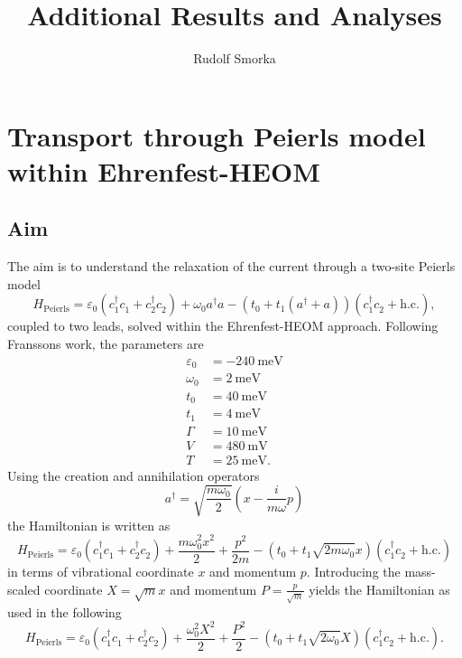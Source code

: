 \documentclass{article}
\newcommand{\pdagger}{{\phantom{\dagger}}}
\begin{document}
\title{Additional Results and Analyses}
\author{Rudolf Smorka}
\maketitle
\section{Transport through Peierls model within Ehrenfest-HEOM}
\subsection{Aim}
The aim is to understand the relaxation of the current through a two-site Peierls model 
\begin{equation}
	H_\mathrm{Peierls} = \varepsilon_0 (c_1^\dagger c_1^\pdagger + c_2^\dagger c_2^\pdagger)+ \omega_0 a^\dagger a -(t_0 + t_1(a^\dagger + a))(c_1^\dagger c_2^\pdagger + \mathrm{h.c.}),
\end{equation}
coupled to two leads, solved within the Ehrenfest-HEOM approach. Following Franssons work, the parameters are
\begin{align*}
	\varepsilon_0 &= -\SI{240}{\milli\electronvolt}\\
	\omega_0 &= \SI{2}{\milli\electronvolt}\\
	t_0 &= \SI{40}{\milli\electronvolt}\\
	t_1 &= \SI{4}{\milli\electronvolt}\\
	\Gamma &= \SI{10}{\milli\electronvolt}\\
	V 	&= \SI{480}{\milli\volt}\\
	T &= \SI{25}{\milli\electronvolt}.
\end{align*}
Using the creation and annihilation operators
\begin{equation}
	a^\dagger = \sqrt{\frac{m\omega_0}{2}} \left(x - \frac{i}{m\omega}p\right)
\end{equation}
the Hamiltonian is written as 
\begin{equation}
	H_\mathrm{Peierls} = \varepsilon_0 (c_1^\dagger c_1^\pdagger + c_2^\dagger c_2^\pdagger)+ \frac{m\omega_0^2 x^2}{2} + \frac{p^2}{2 m} -\left(t_0 + t_1\sqrt{2m\omega_0}x\right)(c_1^\dagger c_2^\pdagger + \mathrm{h.c.})
\end{equation}
in terms of vibrational coordinate $x$ and momentum $p$. Introducing the mass-scaled coordinate $X = \sqrt{m}x$ and momentum $P = \frac{p}{\sqrt{m}}$ yields the Hamiltonian as used in the following
\begin{equation}
	H_\mathrm{Peierls} = \varepsilon_0 (c_1^\dagger c_1^\pdagger + c_2^\dagger c_2^\pdagger)+ \frac{\omega_0^2 X^2}{2} + \frac{P^2}{2} -\left(t_0 + t_1\sqrt{2\omega_0}X\right)(c_1^\dagger c_2^\pdagger + \mathrm{h.c.}).
\end{equation}
\end{document}
